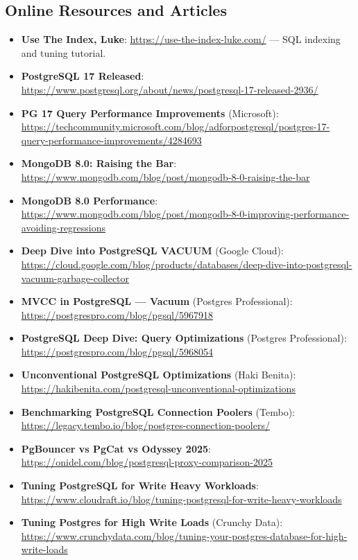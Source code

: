\documentclass[12pt,a4paper]{article}
\begin{document}
\subsection{Online Resources and Articles}

\begin{itemize}
    \item \textbf{Use The Index, Luke}: \url{https://use-the-index-luke.com/} --- SQL indexing and tuning tutorial.
    \item \textbf{PostgreSQL 17 Released}: \url{https://www.postgresql.org/about/news/postgresql-17-released-2936/}
    \item \textbf{PG 17 Query Performance Improvements} (Microsoft): \url{https://techcommunity.microsoft.com/blog/adforpostgresql/postgres-17-query-performance-improvements/4284693}
    \item \textbf{MongoDB 8.0: Raising the Bar}: \url{https://www.mongodb.com/blog/post/mongodb-8-0-raising-the-bar}
    \item \textbf{MongoDB 8.0 Performance}: \url{https://www.mongodb.com/blog/post/mongodb-8-0-improving-performance-avoiding-regressions}
    \item \textbf{Deep Dive into PostgreSQL VACUUM} (Google Cloud): \url{https://cloud.google.com/blog/products/databases/deep-dive-into-postgresql-vacuum-garbage-collector}
    \item \textbf{MVCC in PostgreSQL --- Vacuum} (Postgres Professional): \url{https://postgrespro.com/blog/pgsql/5967918}
    \item \textbf{PostgreSQL Deep Dive: Query Optimizations} (Postgres Professional): \url{https://postgrespro.com/blog/pgsql/5968054}
    \item \textbf{Unconventional PostgreSQL Optimizations} (Haki Benita): \url{https://hakibenita.com/postgresql-unconventional-optimizations}
    \item \textbf{Benchmarking PostgreSQL Connection Poolers} (Tembo): \url{https://legacy.tembo.io/blog/postgres-connection-poolers/}
    \item \textbf{PgBouncer vs PgCat vs Odyssey 2025}: \url{https://onidel.com/blog/postgresql-proxy-comparison-2025}
    \item \textbf{Tuning PostgreSQL for Write Heavy Workloads}: \url{https://www.cloudraft.io/blog/tuning-postgresql-for-write-heavy-workloads}
    \item \textbf{Tuning Postgres for High Write Loads} (Crunchy Data): \url{https://www.crunchydata.com/blog/tuning-your-postgres-database-for-high-write-loads}

\end{itemize}
\end{document}
